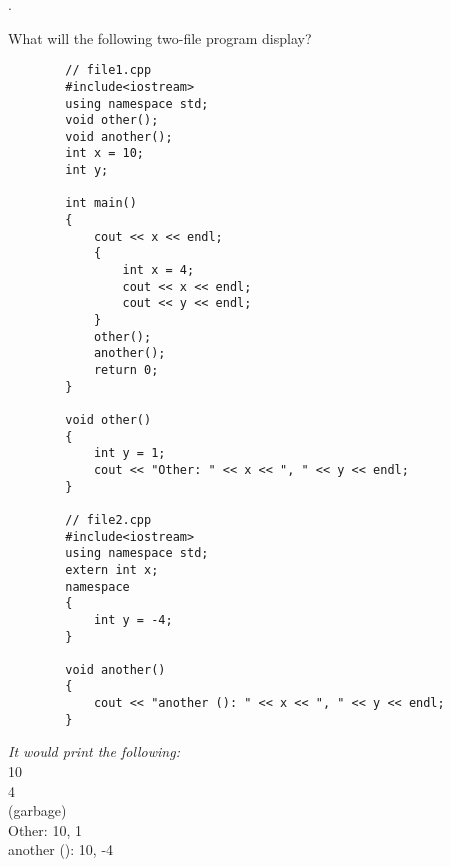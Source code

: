\documentclass{amsart}
\begin{document}
\phantom{}
\vfill
{}. 
\begin{minipage}[t]{11.5 cm}
	What will the following two-file program display?
	\begin{verbatim}
		// file1.cpp
		#include<iostream>
		using namespace std;
		void other();
		void another();
		int x = 10;
		int y;

		int main()
		{
		    cout << x << endl;
		    {
		        int x = 4;
		        cout << x << endl;
		        cout << y << endl;
		    }
		    other();
		    another();
		    return 0;
		}

		void other()
		{
		    int y = 1;
		    cout << "Other: " << x << ", " << y << endl;
		}

		// file2.cpp
		#include<iostream>
		using namespace std;
		extern int x;
		namespace
		{
		    int y = -4;
		}

		void another()
		{
		    cout << "another (): " << x << ", " << y << endl;
		}
	\end{verbatim}
\end{minipage}
\phantom{3. } 
\begin{minipage}[t]{11.5 cm}
	{\slshape It would print the following:} \\
	\phantom{\qquad}10 \\
	\phantom{\qquad}4 \\
	\phantom{\qquad}(garbage) \\
	\phantom{\qquad}Other: 10, 1 \\
	\phantom{\qquad}another (): 10, -4 \\
%
\end{minipage} 
\vfill
\newpage
\end{document}
